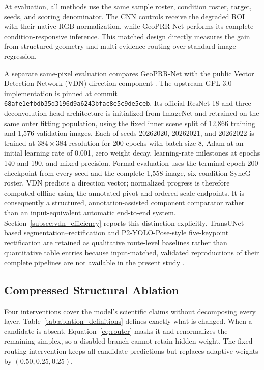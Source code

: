 \documentclass[electronics,article,submit,oneauthor]{Definitions/mdpi}
\newcommand{\modelname}{GeoPRR-Net\xspace}
\begin{document}
At evaluation, all methods use the same sample roster, condition roster, target, seeds, and scoring denominator. The CNN controls receive the degraded ROI with their native RGB normalization, while \modelname performs its complete condition-responsive inference. This matched design directly measures the gain from structured geometry and multi-evidence routing over standard image regression.

A separate same-pixel evaluation compares \modelname with the public Vector Detection Network (VDN) direction component \cite{dong2021vdn}. The upstream GPL-3.0 implementation is pinned at commit \texttt{68afe1efbdb35d3196d9a6243bfac8e5c9de5ceb}. Its official ResNet-18 and three-deconvolution-head architecture is initialized from ImageNet and retrained on the same outer fitting population, using the fixed inner scene split of 12,866 training and 1,576 validation images. Each of seeds 20262020, 20262021, and 20262022 is trained at $384\times384$ resolution for 200 epochs with batch size 8, Adam at an initial learning rate of 0.001, zero weight decay, learning-rate milestones at epochs 140 and 190, and mixed precision. Formal evaluation uses the terminal epoch-200 checkpoint from every seed and the complete 1,558-image, six-condition SyncG roster. VDN predicts a direction vector; normalized progress is therefore computed offline using the annotated pivot and ordered scale endpoints. It is consequently a structured, annotation-assisted component comparator rather than an input-equivalent automatic end-to-end system. Section~\ref{subsec:vdn_efficiency} reports this distinction explicitly. TransUNet-based segmentation--rectification and P2-YOLO-Pose-style five-keypoint rectification are retained as qualitative route-level baselines rather than quantitative table entries because input-matched, validated reproductions of their complete pipelines are not available in the present study \cite{tan2024transunet,lee2026p2yolo}.

\subsection{Compressed Structural Ablation}
\label{subsec:ablation_protocol}

Four interventions cover the model's scientific claims without decomposing every layer. Table~\ref{tab:ablation_definitions} defines exactly what is changed. When a candidate is absent, Equation~\eqref{eq:router} masks it and renormalizes the remaining simplex, so a disabled branch cannot retain hidden weight. The fixed-routing intervention keeps all candidate predictions but replaces adaptive weights by $(0.50,0.25,0.25)$.
\end{document}
